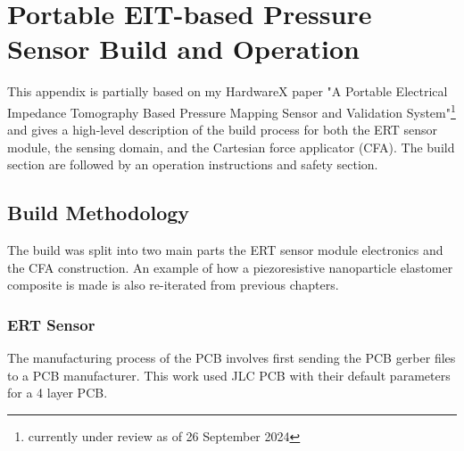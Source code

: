 \chapter{Portable EIT-based Pressure Sensor Build and Operation}
\label{appendix-E}

This appendix is partially based on my HardwareX paper "A Portable Electrical Impedance Tomography Based Pressure Mapping Sensor and Validation System"\footnote{currently under review as of 26 September 2024} and gives a high-level description of the build process for both the ERT sensor module, the sensing domain, and the Cartesian force applicator (CFA). The build section are followed by an operation instructions and safety section.

\section{Build Methodology}
The build was split into two main parts the ERT sensor module electronics and the CFA construction. An example of how a piezoresistive nanoparticle elastomer composite is made is also re-iterated from previous chapters.


\subsection{ERT Sensor}
The manufacturing process of the PCB involves first sending the PCB gerber files to a PCB manufacturer. This work used JLC PCB with their default parameters for a 4 layer PCB.

